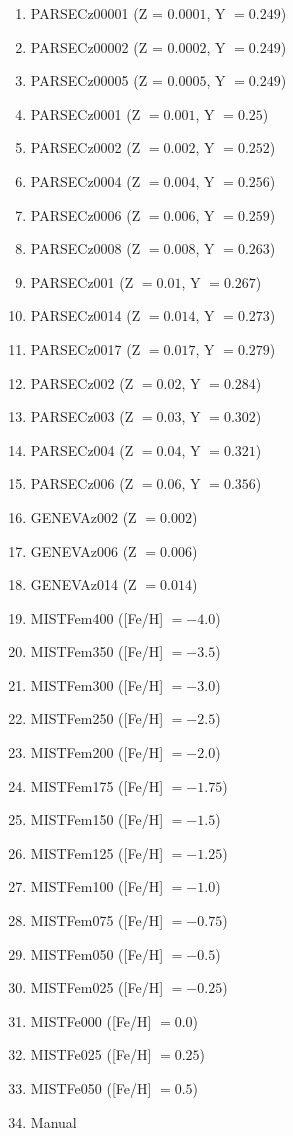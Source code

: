 \documentclass[fleqn,usenatbib]{rasti}
\begin{document}
\begin{enumerate}
    \item PARSECz00001 (Z = $0.0001$, Y $= 0.249$)
    \item PARSECz00002 (Z = $0.0002$, Y $= 0.249$)
    \item PARSECz00005 (Z = $0.0005$, Y $= 0.249$)
    \item PARSECz0001 (Z $= 0.001$, Y $= 0.25$)
    \item PARSECz0002 (Z $= 0.002$, Y $= 0.252$)
    \item PARSECz0004 (Z $= 0.004$, Y $= 0.256$)
    \item PARSECz0006 (Z $= 0.006$, Y $= 0.259$)
    \item PARSECz0008 (Z $= 0.008$, Y $= 0.263$)
    \item PARSECz001 (Z $= 0.01$, Y $= 0.267$)
    \item PARSECz0014 (Z $= 0.014$, Y $= 0.273$)
    \item PARSECz0017 (Z $= 0.017$, Y $= 0.279$)
    \item PARSECz002 (Z $= 0.02$, Y $= 0.284$)
    \item PARSECz003 (Z $= 0.03$, Y $= 0.302$)
    \item PARSECz004 (Z $= 0.04$, Y $= 0.321$)
    \item PARSECz006 (Z $= 0.06$, Y $= 0.356$)
    \item GENEVAz002 (Z $= 0.002$)
    \item GENEVAz006 (Z $= 0.006$)
    \item GENEVAz014 (Z $= 0.014$)
    \item MISTFem400 ([Fe/H] $= -4.0$)
    \item MISTFem350 ([Fe/H] $= -3.5$)
    \item MISTFem300 ([Fe/H] $= -3.0$)
    \item MISTFem250 ([Fe/H] $= -2.5$)
    \item MISTFem200 ([Fe/H] $= -2.0$)
    \item MISTFem175 ([Fe/H] $= -1.75$)
    \item MISTFem150 ([Fe/H] $= -1.5$)
    \item MISTFem125 ([Fe/H] $= -1.25$)
    \item MISTFem100 ([Fe/H] $= -1.0$)
    \item MISTFem075 ([Fe/H] $= -0.75$)
    \item MISTFem050 ([Fe/H] $= -0.5$)
    \item MISTFem025 ([Fe/H] $= -0.25$)
    \item MISTFe000 ([Fe/H] $= 0.0$)
    \item MISTFe025 ([Fe/H] $= 0.25$)
    \item MISTFe050 ([Fe/H] $= 0.5$)
    \item Manual
\end{enumerate}
\end{document}
